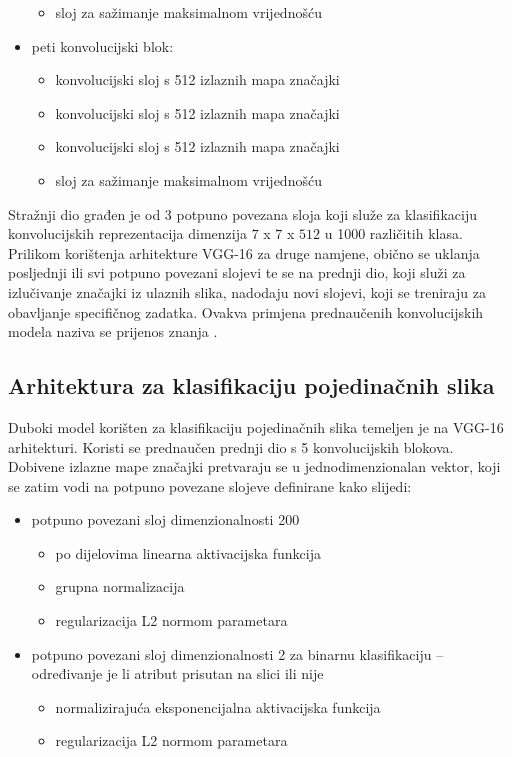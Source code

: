 \documentclass[times, utf8, diplomski, numeric]{fer}
\begin{document}
\begin{itemize}
\begin{itemize}
  \item sloj za sažimanje maksimalnom vrijednošću
 \end{itemize}
     \item peti konvolucijski blok:
 \begin{itemize}
  \item konvolucijski sloj s 512 izlaznih mapa značajki
  \item konvolucijski sloj s 512 izlaznih mapa značajki
  \item konvolucijski sloj s 512 izlaznih mapa značajki
  \item sloj za sažimanje maksimalnom vrijednošću
 \end{itemize}
\end{itemize}

Stražnji dio građen je od  3 potpuno povezana sloja koji služe za klasifikaciju konvolucijskih reprezentacija dimenzija $7$ x $7$ x $512$ u 1000 različitih klasa. 
Prilikom korištenja arhitekture VGG-16 za druge namjene, obično se uklanja posljednji ili svi potpuno povezani slojevi te se na prednji dio, koji služi za izlučivanje značajki iz ulaznih slika, nadodaju novi slojevi, koji se treniraju za obavljanje specifičnog zadatka.
Ovakva primjena prednaučenih konvolucijskih modela naziva se prijenos znanja  \citep{proceeding:transfer_learning}.

\subsection{Arhitektura za klasifikaciju pojedinačnih slika}
Duboki model korišten za klasifikaciju pojedinačnih slika temeljen je na VGG-16 arhitekturi. 
Koristi se prednaučen prednji dio s 5 konvolucijskih blokova. 
Dobivene izlazne mape značajki pretvaraju se u jednodimenzionalan vektor, koji se zatim vodi na potpuno povezane slojeve definirane kako slijedi:
\begin{itemize}
 \item potpuno povezani sloj dimenzionalnosti 200
 \begin{itemize}
  \item po dijelovima linearna  aktivacijska funkcija
  \item grupna normalizacija 
  \item regularizacija L2 normom parametara
 \end{itemize}
 \item potpuno povezani sloj dimenzionalnosti 2 za binarnu klasifikaciju -- određivanje je li atribut prisutan na slici ili nije
 \begin{itemize}
  \item normalizirajuća eksponencijalna  aktivacijska funkcija
  \item regularizacija L2 normom parametara
 \end{itemize}
\end{itemize}
\end{document}
